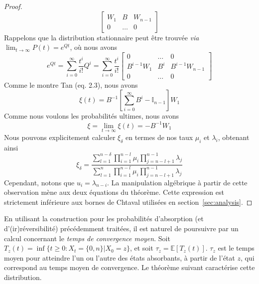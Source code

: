 \documentclass[letterpaper,twocolumn,10pt]{article}
\newcommand\ddfrac[2]{\frac{\displaystyle #1}{\displaystyle #2}}
\theoremstyle{definition}
\begin{document}
\begin{appendices}
\begin{proof}
\[\begin{bmatrix}
        W_1 & B & W_{n-1}\\
        0 & \dots & 0
    \end{bmatrix}
\]
Rappelons que la distribution stationnaire peut être trouvée \emph{via} $\lim_{t \rightarrow \infty} P(t) = e^{Qt}$, où nous avons
\[
    e^{Qt} = \sum_{i = 0}^{\infty} \frac{t^i}{i!} Q^i = \sum_{i = 0}^{\infty} \frac{t^i}{i!}
    \begin{bmatrix}
        0 & \dots & 0\\
        B^{i-1}W_1 & B^i & B^{i-1}W_{n-1}\\
        0 & \dots & 0
    \end{bmatrix}
\]
Comme le montre Tan (eq. 2.3), nous avons
\[
    \xi(t) = B^{-1}\left[\sum_{i = 0}^{\infty} B^i  - \mathbb{I}_{n-1} \right] W_1
\]
Comme nous voulons les probabilités ultimes, nous avons 
\[
    \xi = \lim_{t \rightarrow \infty} \xi(t) = -B^{-1}W_1
\]
Nous pouvons explicitement calculer $\xi_\delta$ en termes de nos taux $\mu_i$ et $\lambda_i$, obtenant ainsi
\[
    \xi_\delta = \ddfrac{\sum_{l = 1}^{n-\delta}\prod_{i = 1}^{n-l}\mu_i \prod_{j = n-l+1}^{n-1}\lambda_j}{\sum_{l = 1}^{n}\prod_{i = 1}^{n-l}\mu_i \prod_{j = n-l+1}^{n-1}\lambda_j}
\]
Cependant, notons que $u_{i} = \lambda_{n-i}$. La manipulation algébrique à partir de cette observation mène aux deux équations du théorème. Cette expression est strictement inférieure aux bornes de Chtaval utilisées en section~\ref{sec:analysis}.
\end{proof}

En utilisant la construction pour les probabilités d'absorption (et d'(ir)réversibilité) précédemment traitées, il est naturel de poursuivre par un calcul concernant le \emph{temps de convergence moyen}.
Soit $T_{z}(t) = \inf \{t \geq 0 : X_t = \{0, n\} | X_0 = z\}$, et soit $\tau_z = \mathbb{E}[T_{z}(t)]$. $\tau_z$ est le temps moyen pour atteindre l'un ou l'autre des états absorbants, à partir de l'état $z$, qui correspond au temps moyen de convergence. Le théorème suivant caractérise cette distribution.


\end{appendices}
\end{document}
